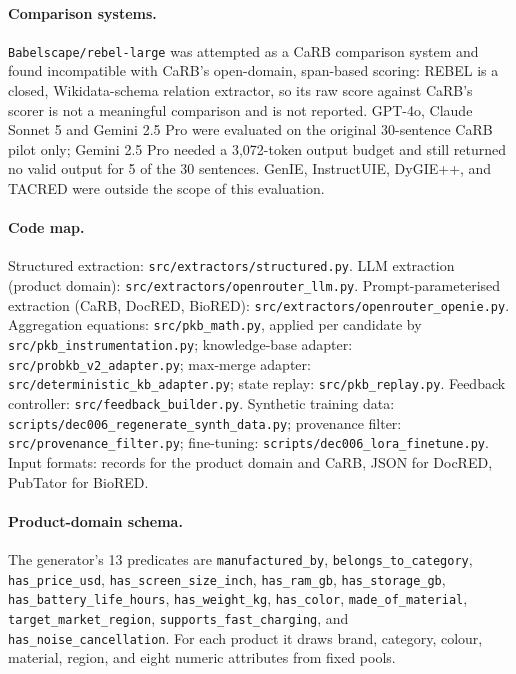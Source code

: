 \documentclass[11pt]{article}
\begin{document}
\paragraph{Comparison systems.} \texttt{Babelscape/rebel-large} was
attempted as a CaRB comparison system and found incompatible with CaRB's
open-domain, span-based scoring: REBEL is a closed, Wikidata-schema
relation extractor, so its raw score against CaRB's scorer is not a
meaningful comparison and is not reported. GPT-4o, Claude Sonnet 5 and
Gemini 2.5 Pro were evaluated on the original 30-sentence CaRB pilot
only; Gemini 2.5 Pro needed a 3,072-token output budget and still
returned no valid output for 5 of the 30 sentences. GenIE, InstructUIE, DyGIE++, and TACRED were outside the scope of this evaluation.

\begin{sloppypar}
\paragraph{Code map.} Structured extraction:
\texttt{src/extractors/structured.py}. LLM extraction (product domain):
\texttt{src/extractors/openrouter\_llm.py}. Prompt-parameterised
extraction (CaRB, DocRED, BioRED):
\texttt{src/extractors/openrouter\_openie.py}. Aggregation equations:
\texttt{src/pkb\_math.py}, applied per candidate by
\texttt{src/pkb\_instrumentation.py}; knowledge-base adapter:
\texttt{src/probkb\_v2\_adapter.py}; max-merge adapter:
\texttt{src/deterministic\_kb\_adapter.py}; state replay:
\texttt{src/pkb\_replay.py}. Feedback controller:
\texttt{src/feedback\_builder.py}. Synthetic training data:
\texttt{scripts/dec006\_regenerate\_synth\_data.py}; provenance filter:
\texttt{src/provenance\_filter.py}; fine-tuning:
\texttt{scripts/dec006\_lora\_finetune.py}. Input formats: records for
the product domain and CaRB, JSON for DocRED, PubTator for BioRED.

\paragraph{Product-domain schema.} The generator's 13 predicates are
\texttt{manufactured\_by}, \texttt{belongs\_to\_category},
\texttt{has\_price\_usd}, \texttt{has\_screen\_size\_inch},
\texttt{has\_ram\_gb}, \texttt{has\_storage\_gb},
\texttt{has\_battery\_life\_hours}, \texttt{has\_weight\_kg},
\texttt{has\_color}, \texttt{made\_of\_material},
\texttt{target\_market\_region}, \texttt{supports\_fast\_charging}, and
\texttt{has\_noise\_cancellation}. For each product it draws brand,
category, colour, material, region, and eight numeric attributes from
fixed pools.


\end{sloppypar}
\end{document}
